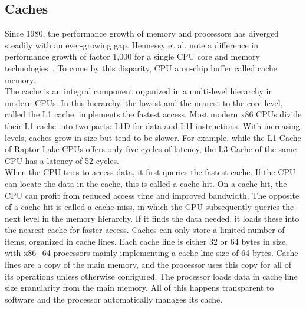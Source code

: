 \subsection{Caches}
\label{sec:state:technical:caches}
Since 1980, the performance growth of memory and processors has diverged
steadily with an ever-growing gap. Hennessy et al. note a difference in
performance growth of factor 1,000 for a single CPU core and memory
technologies~\cite{hennessy2011computer}. To come by this disparity, CPU a
on-chip buffer called cache memory.\\


The cache is an integral component organized in a multi-level hierarchy in
modern CPUs. In this hierarchy, the lowest and the nearest to the core level,
called the L1 cache, implements the fastest access. Most modern x86 CPUs divide
their L1 cache into two parts: L1D for data and L1I instructions. With
increasing levels, caches grow in size but tend to be slower. For example, while
the L1 Cache of Raptor Lake CPUs offers only five cycles of latency, the L3
Cache of the same CPU has a latency of 52 cycles.\\

When the CPU tries to access data, it first queries the fastest cache. If the
CPU can locate the data in the cache, this is called a cache hit. On a cache
hit, the CPU can profit from reduced access time and improved bandwidth. The
opposite of a cache hit is called a cache miss, in which the CPU subsequently
queries the next level in the memory hierarchy. If it finds the data needed, it
loads these into the nearest cache for faster access. Caches can only store a
limited number of items, organized in cache lines. Each cache line is either 32
or 64 bytes in size, with x86\_64 processors mainly implementing a cache line
size of 64 bytes. Cache lines are a copy of the main memory, and the processor
uses this copy for all of its operations unless otherwise configured. The
processor loads data in cache line size granularity from the main memory. All of
this happens transparent to software and the processor automatically manages its
cache. \\

